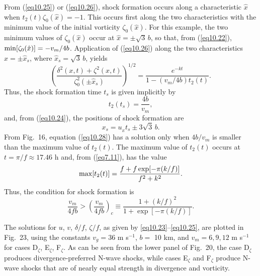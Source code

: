 \documentclass[10pt]{article}
\begin{document}
From (\ref{eq10.25}) or (\ref{eq10.26}), shock formation occurs along a characteristic
$\hat{x}$ when $t_2(t)\zeta_0(\hat{x}) = -1$. This occurs first along the two characteristics
with the minimum value of the initial vorticity $\zeta_0(\hat{x})$. For this example,
the two minimum values of $\zeta_0(\hat{x})$ occur at $\hat{x}=\pm\sqrt{3}\, b$, so that,
from (\ref{eq10.22}), ${\rm min}[\zeta_0(\hat{x})] = -v_m/4b$. Application of (\ref{eq10.26})
along the two characteristics $\hat{x}=\pm\hat{x}_s$, where $\hat{x}_s=\sqrt{3}\, b$, yields
\begin{equation}                                    %
        \left(\frac{\delta^2(x,t) + \zeta^2(x,t)}{\zeta_0^2(\pm\hat{x}_s)}\right)^{1/2}
     = \frac{e^{-kt}}{1 - (v_m/4b)t_2(t)}.
\label{eq10.27}
\end{equation}
Thus, the shock formation time $t_s$ is given implicitly by
\begin{equation}                                  %
          t_2(t_s) = \frac{4b}{v_m},
\label{eq10.28}
\end{equation}
and, from (\ref{eq10.24}), the positions of shock formation are
\begin{equation}                                  %
            x_s = u_{_E} t_s \pm 3\sqrt{3}\, b.
\label{eq10.29}
\end{equation}
From Fig.~16, equation (\ref{eq10.28}) has a solution only when $4b/v_m$
is smaller than the maximum value of $t_2(t)$. The maximum value of $t_2(t)$
occurs at $t=\pi/f\approx 17.46$ h and, from (\ref{eq7.11}), has the value
   $$   {\rm max}[t_2(t)] = \frac{f+f\exp[-\pi(k/f)]}{f^2+k^2}.  $$
Thus, the condition for shock formation is
\begin{equation}                                  %
       \frac{v_m}{4fb} > \left(\frac{v_m}{4fb}\right)_c
       \equiv \frac{1 + (k/f)^2}{1 + \exp[-\pi(k/f)]}.
\label{eq10.30}
\end{equation}

The solutions for $u$, $v$, $\delta/f$, $\zeta/f$, as given by \eqref{eq10.23}--\eqref{eq10.25},
are plotted in Fig.~23, using the constants $v_g=36$ m s$^{-1}$,
$b=$ 10 km, and $v_m=6,9,12$ m s$^{-1}$ for cases D$_\zeta$, E$_\zeta$, F$_\zeta$.
As can be seen from the lower panel of Fig.~20, the case D$_\zeta$ produces
divergence-preferred N-wave shocks, while cases E$_\zeta$ and F$_\zeta$
produce N-wave shocks that are of nearly equal strength in divergence and vorticity.
\end{document}
